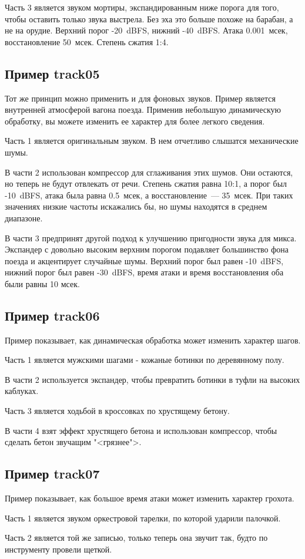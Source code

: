 \documentclass[oneside, final, 14pt]{extreport}
\begin{document}
Часть 3 является звуком мортиры, экспандированным ниже порога для того, чтобы оставить только звука выстрела. Без эха это больше похоже на барабан, а не на орудие. Верхний порог -20~dBFS, нижний -40~dBFS. Атака 0.001~мсек, восстановление 50~мсек. Степень сжатия 1:4.

\subsection{Пример track05}
Тот же принцип можно применить и для фоновых звуков. Пример является внутренней атмосферой вагона поезда. Применив небольшую динамическую обработку, вы можете изменить ее характер для более легкого сведения.

Часть 1 является оригинальным звуком. В нем отчетливо слышатся механические шумы.

В части 2 использован компрессор для сглаживания этих шумов. Они остаются, но теперь не будут отвлекать от речи. Степень сжатия равна 10:1, а порог был -10~dBFS, атака была равна 0.5~мсек, а восстановление~--- 35~мсек. При таких значениях низкие частоты искажались бы, но шумы находятся в среднем диапазоне.

В части 3 предпринят другой подход к улучшению пригодности звука для микса. Экспандер с довольно высоким верхним порогом подавляет большинство фона поезда и акцентирует случайные шумы. Верхний порог был равен -10~dBFS, нижний порог был равен -30~dBFS, время атаки и время восстановления оба были равны 10 мсек.

\subsection{Пример track06}
Пример показывает, как динамическая обработка может изменить характер шагов.

Часть 1 является мужскими шагами - кожаные ботинки по деревянному полу.

В части 2 используется экспандер, чтобы превратить ботинки в туфли на высоких каблуках.

Часть 3 является ходьбой в кроссовках по хрустящему бетону.

В части 4 взят эффект хрустящего бетона и использован компрессор, чтобы сделать бетон звучащим "<грязнее">.

\subsection{Пример track07}
Пример показывает, как большое время атаки может изменить характер грохота.

Часть 1 является звуком оркестровой тарелки, по которой ударили палочкой.

Часть 2 является той же записью, только теперь она звучит так, будто по инструменту провели щеткой.
\end{document}
